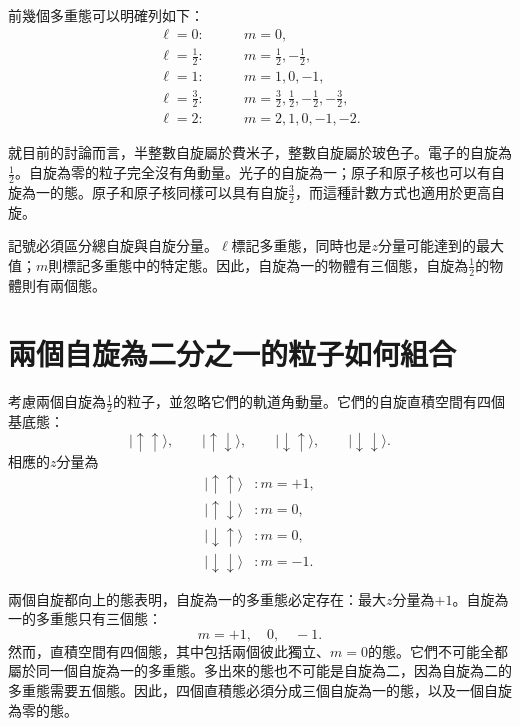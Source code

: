 前幾個多重態可以明確列如下：
\begin{align}
\ell=0:&\qquad m=0,\\
\ell=\frac12:&\qquad m=\frac12,-\frac12,\\
\ell=1:&\qquad m=1,0,-1,\\
\ell=\frac32:&\qquad
m=\frac32,\frac12,-\frac12,-\frac32,\\
\ell=2:&\qquad m=2,1,0,-1,-2.
\end{align}

就目前的討論而言，半整數自旋屬於費米子，整數自旋屬於玻色子。電子的自旋為\(\tfrac12\)。自旋為零的粒子完全沒有角動量。光子的自旋為一；原子和原子核也可以有自旋為一的態。原子和原子核同樣可以具有自旋\(\tfrac32\)，而這種計數方式也適用於更高自旋。

記號必須區分總自旋與自旋分量。\(\ell\)標記多重態，同時也是\(z\)分量可能達到的最大值；\(m\)則標記多重態中的特定態。因此，自旋為一的物體有三個態，自旋為\(\tfrac12\)的物體則有兩個態。

\section{兩個自旋為二分之一的粒子如何組合}

考慮兩個自旋為\(\tfrac12\)的粒子，並忽略它們的軌道角動量。它們的自旋直積空間有四個基底態：
\begin{equation}
|\uparrow\uparrow\rangle,\qquad
|\uparrow\downarrow\rangle,\qquad
|\downarrow\uparrow\rangle,\qquad
|\downarrow\downarrow\rangle.
\end{equation}
相應的\(z\)分量為
\begin{align}
|\uparrow\uparrow\rangle &: m=+1,\\
|\uparrow\downarrow\rangle &: m=0,\\
|\downarrow\uparrow\rangle &: m=0,\\
|\downarrow\downarrow\rangle &: m=-1.
\end{align}

兩個自旋都向上的態表明，自旋為一的多重態必定存在：最大\(z\)分量為\(+1\)。自旋為一的多重態只有三個態：
\begin{equation}
m=+1,\quad 0,\quad -1.
\end{equation}
然而，直積空間有四個態，其中包括兩個彼此獨立、\(m=0\)的態。它們不可能全都屬於同一個自旋為一的多重態。多出來的態也不可能是自旋為二，因為自旋為二的多重態需要五個態。因此，四個直積態必須分成三個自旋為一的態，以及一個自旋為零的態。

